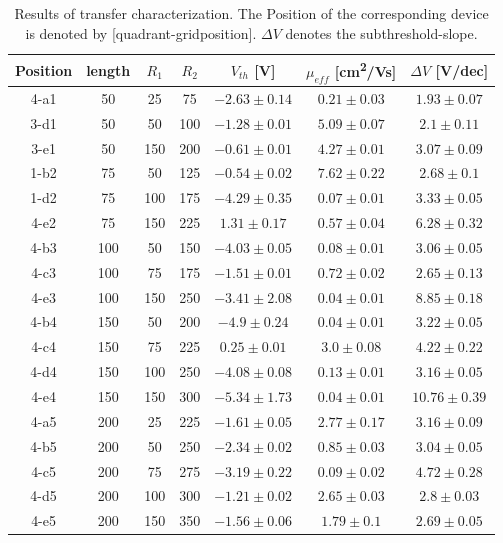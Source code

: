 \documentclass[%
 reprint,
amsmath,amssymb,
pra,
]{revtex4-1}
\begin{document}
\begin{table}
\centering
\begin{tabular}{|c|c|c|c|c|c|c|}
\hline 
Position & length & $R_1$ & $R_2$ & $V_{th}$ [\si{\volt}]  & $\mu_{eff}$  [\si{cm^2/Vs}] & $\Delta V$ [\si{V/dec}]\\ 
\hline 
4-a1 & 50 & 25 & 75 & $-2.63\pm 0.14$ & $0.21\pm 0.03$ & $1.93\pm 0.07$\\
\hline 
3-d1 & 50 & 50 & 100 & $-1.28\pm 0.01$ & $5.09\pm 0.07$& $2.1\pm 0.11$\\
\hline 
3-e1 & 50 & 150 & 200 & $-0.61\pm 0.01$ & $4.27\pm 0.01$& $3.07\pm 0.09$\\
\hline 
\hline 
1-b2 & 75 & 50 & 125 & $-0.54\pm 0.02$ & $7.62\pm 0.22$& $2.68\pm 0.1$\\
\hline 
1-d2 & 75 & 100 & 175 & $-4.29\pm 0.35$ & $0.07\pm 0.01$& $3.33\pm 0.05$\\
\hline 
4-e2 & 75 & 150 & 225 & $1.31\pm 0.17$ & $0.57\pm 0.04$& $6.28\pm 0.32$\\
\hline 
\hline  
4-b3 & 100 & 50 & 150 & $-4.03\pm 0.05$ & $0.08\pm 0.01$& $3.06\pm 0.05$\\
\hline 
4-c3 & 100 & 75 & 175 & $-1.51\pm 0.01$ & $0.72\pm 0.02$& $2.65\pm 0.13$\\
\hline 
4-e3 & 100 & 150 & 250 & $-3.41\pm 2.08$ & $0.04\pm 0.01$& $8.85\pm 0.18$\\
\hline
\hline 
4-b4 & 150 & 50 & 200 & $-4.9\pm 0.24$ & $0.04\pm 0.01$& $3.22\pm 0.05$\\
\hline
4-c4 & 150 & 75 & 225 & $0.25\pm 0.01$ & $3.0\pm 0.08$& $4.22\pm 0.22$\\
\hline 
4-d4 & 150 & 100 & 250 & $-4.08\pm 0.08$ & $0.13\pm 0.01$& $3.16\pm 0.05$\\
\hline 
4-e4 & 150 & 150 & 300 & $-5.34\pm 1.73$ & $0.04\pm 0.01$& $10.76\pm 0.39$\\
\hline 
\hline 
4-a5 & 200 & 25 & 225 & $-1.61\pm 0.05$ & $2.77\pm 0.17$& $3.16\pm 0.09$\\
\hline 
4-b5 & 200 & 50 & 250 & $-2.34\pm 0.02$ & $0.85\pm 0.03$& $3.04\pm 0.05$\\
\hline 
4-c5 & 200 & 75 & 275 & $-3.19\pm 0.22$ & $0.09\pm 0.02$& $4.72\pm 0.28$\\
\hline
4-d5 & 200 & 100 & 300 & $-1.21\pm 0.02$ & $2.65\pm 0.03$& $2.8\pm 0.03$\\
\hline 
4-e5 & 200 & 150 & 350 & $-1.56\pm 0.06$ & $1.79\pm 0.1$& $2.69\pm 0.05$\\
\hline 
\end{tabular} 
\caption{Results of transfer characterization. The Position of the corresponding device is denoted by [quadrant-gridposition]. $\Delta V$ denotes the subthreshold-slope.}
\label{tab:transfer_results}
\end{table}
\end{document}
